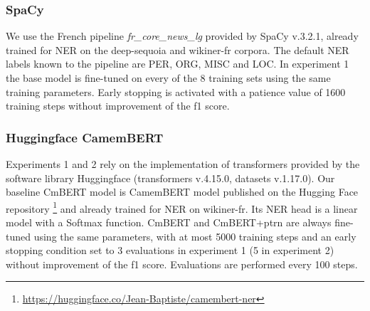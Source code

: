 

\subsubsection{SpaCy}
We use the French pipeline \textit{fr\_core\_news\_lg} provided by SpaCy v.3.2.1, already trained for NER on the deep-sequoia and wikiner-fr corpora.
The default NER labels known to the pipeline are PER, ORG, MISC and LOC.
In experiment 1 the base model is fine-tuned on every of the 8 training sets using the same training parameters.
Early stopping is activated with a patience value of 1600 training steps without improvement of the f1 score.





\subsubsection{Huggingface CamemBERT}
Experiments 1 and 2 rely on the implementation of transformers provided by the software library Huggingface (transformers v.4.15.0, datasets v.1.17.0).
Our baseline CmBERT model is CamemBERT model published on the Hugging Face repository \footnote{\url{https://huggingface.co/Jean-Baptiste/camembert-ner}} and already trained for NER on wikiner-fr.
Its NER head is a linear model with a Softmax function.
CmBERT and CmBERT+ptrn are always fine-tuned using the same parameters, with at most 5000 training steps and an early stopping condition set to 3 evaluations in experiment 1 (5 in experiment 2) without improvement of the f1 score. Evaluations are performed every 100 steps.


